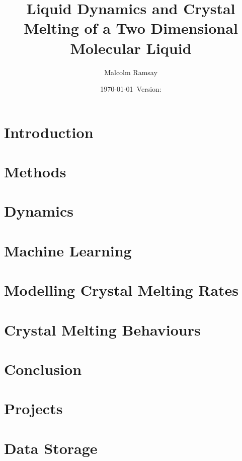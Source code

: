 \documentclass[12pt, a4paper]{report}
\title{Liquid Dynamics and Crystal Melting of a Two Dimensional Molecular Liquid}
\author{Malcolm Ramsay}
\date{\today{}~Version: \version}
\begin{document}
\beforepreface{}
\afterpreface{}

\chapter{Introduction} \label{sec:Introduction}






\chapter{Methods} \label{sec:Methods}







\chapter{Dynamics} \label{sec:Dynamics}




\chapter{Machine Learning} \label{sec:Machine_Learning}




\chapter{Modelling Crystal Melting Rates} \label{sec:Crystal_Melting}





\chapter{Crystal Melting Behaviours} \label{sec:Melting_Behaviour}




\chapter{Conclusion}

\printbibliography{}

\begin{appendices}
  \chapter{Projects}
  

  \chapter{Data Storage}
  

\end{appendices}
\end{document}
